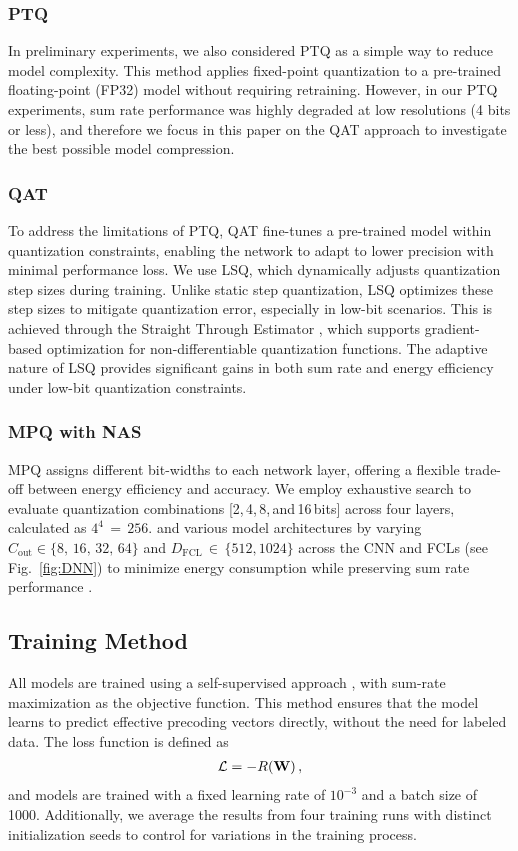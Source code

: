 \subsubsection{\gls{PTQ}}
In preliminary experiments, we also considered \gls{PTQ} as a simple way to reduce model complexity.
This method applies fixed-point quantization to a pre-trained floating-point (FP32) model without requiring retraining. 
However, in our PTQ experiments, sum rate performance was highly degraded at low resolutions (4 bits or less), and therefore we focus in this paper on the \gls{QAT} approach to investigate the best possible model compression.

\subsubsection{\gls{QAT}}
To address the limitations of \gls{PTQ}, \gls{QAT} fine-tunes a pre-trained model within quantization constraints, enabling the network to adapt to lower precision with minimal performance loss. We use \gls{LSQ}\cite{Esser2020LEARNED}, which dynamically adjusts quantization step sizes during training. Unlike static step quantization, \gls{LSQ} optimizes these step sizes to mitigate quantization error, especially in low-bit scenarios. This is achieved through the Straight Through Estimator \cite{DBLP:journals/corr/abs-2109-05472}, which supports gradient-based optimization for non-differentiable quantization functions. The adaptive nature of \gls{LSQ} provides significant gains in both sum rate and energy efficiency under low-bit quantization constraints.

\subsubsection{\gls{MPQ} with \Gls{NAS}}
\gls{MPQ} assigns different bit-widths to each network layer, offering a flexible trade-off between energy efficiency and accuracy. We employ exhaustive search to evaluate quantization combinations [2,\,4,\,8,\,and\,16\,bits] across four layers, calculated as \(4^4 \)\,$=$\,\(256\).
and various model architectures by varying \( C_{\text{out}} \in \{8,\,16,\,32,\,64\} \) and \( D_{\text{FCL}}\)\,$\in$\,\(\{512, 1024\} \) across the \Gls{CNN} and \glspl{FCL} (see Fig.~\ref{fig:DNN}) to minimize energy consumption while preserving sum rate performance \cite{DBLP:journals/corr/abs-2003-07577}.

\subsection{Training Method}
All models are trained using a self-supervised approach \cite{10624768}, with sum-rate maximization as the objective function. This method ensures that the model learns to predict effective precoding vectors directly, without the need for labeled data. The loss function is defined as 
\begin{align}
    \mathcal{L} = - R(\mathbf{W})\, ,
\end{align}
and models are trained with a fixed learning rate of $10^{-3}$ and a batch size of 1000.
Additionally, we average the results from four training runs with distinct initialization seeds to control for variations in the training process.

